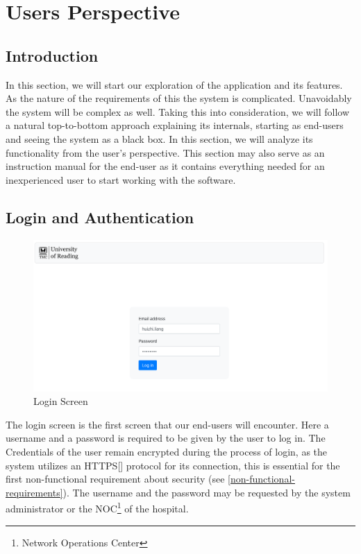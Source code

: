 \chapter{Users Perspective}
\label{users_perspective}
	\section{Introduction}
		In this section, we will start our exploration of the application and its features. As the nature of the requirements of this
		the system is complicated. Unavoidably the system will be complex as well. Taking this into consideration, we will follow a natural top-to-bottom
		approach explaining its internals, starting as end-users and seeing the system as a black box. In this section, we will analyze its 
		functionality from the user's perspective. This section may also serve as an instruction manual for the end-user as it contains everything needed
		for an inexperienced user to start working with the software.
	\section{Login and Authentication}
		\begin{figure}[H]
			\iftrue
			\centering
			\caption{Login Screen}
			\includegraphics[scale=0.3]{figures/login}
			\fi
		\end{figure}
		The login screen is the first screen that our end-users will encounter. Here a username and a password is required to be given by the 
		user to log in. The Credentials of the user remain encrypted during the process of login, as the system utilizes an HTTPS[\cite{rfc2818}] 
		protocol for its connection, this is essential for the first non-functional requirement about security (see \ref{non-functional-requirements}).
		The username and the password may be requested by the system administrator or the NOC\footnote{Network Operations Center} of the hospital.
